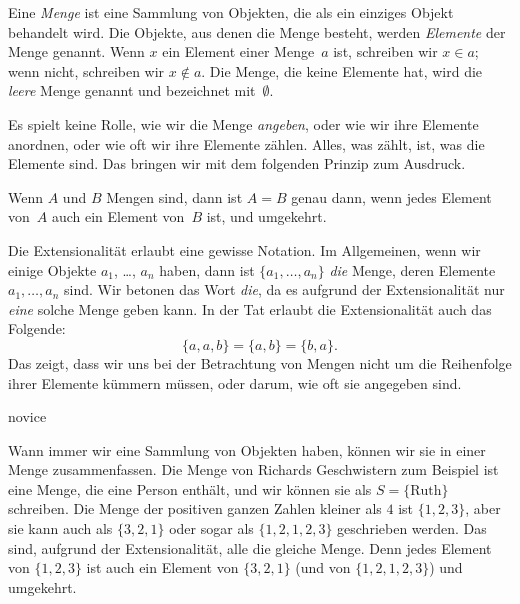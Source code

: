 \documentclass[../../../include/open-logic-section]{subfiles}
\begin{document}

Eine \emph{Menge} ist eine Sammlung von Objekten, die als ein einziges
Objekt behandelt wird. Die Objekte, aus denen die Menge besteht, werden \emph{Elemente} der Menge genannt. Wenn $x$ ein Element 
einer Menge~$a$ ist, schreiben wir $x \in a$; wenn nicht, schreiben wir $x \notin a$. Die Menge, die keine
Elemente hat, wird die \emph{leere} Menge genannt und
bezeichnet mit~\glqq$\emptyset$\grqq.

\begin{explain}
Es spielt keine Rolle, wie wir die Menge \emph{angeben}, oder wie wir
ihre Elemente anordnen, oder wie oft wir ihre Elemente zählen. Alles, was zählt, ist, was die Elemente
sind. Das bringen wir mit dem folgenden Prinzip zum Ausdruck.
\end{explain}

\begin{defn}[Extensionalität]
  Wenn $A$ und $B$ Mengen sind, dann ist $A = B$ genau dann, wenn
  jedes Element von~$A$ auch ein Element von~$B$ ist, und umgekehrt.
\end{defn}

Die Extensionalität erlaubt eine gewisse Notation. Im Allgemeinen, wenn wir einige
Objekte $a_{1}$, \dots, $a_{n}$ haben, dann ist $\{a_{1}, \dots, a_{n}\}$
\emph{die} Menge, deren Elemente $a_1, \dots, a_n$ sind. Wir betonen das Wort \glqq\emph{die}\grqq, da es aufgrund der Extensionalität
nur \emph{eine} solche Menge geben kann. In der Tat erlaubt die Extensionalität auch das
Folgende:
  \[
    \{a, a, b\} = \{a, b\} = \{b,a\}.
  \] 
Das zeigt, dass wir uns bei der Betrachtung von Mengen nicht um die Reihenfolge ihrer Elemente kümmern müssen, 
oder darum, wie oft sie angegeben sind.

\begin{tagblock}{novice}
\begin{ex}
Wann immer wir eine Sammlung von Objekten haben, können wir sie in einer Menge zusammenfassen.
 Die Menge von Richards Geschwistern zum Beispiel ist eine Menge, die
eine Person enthält, und wir können sie als $S=\{\textrm{Ruth}\}$ schreiben.
Die Menge der positiven ganzen Zahlen kleiner als $4$ ist $\{1, 2, 3\}$, aber sie
kann auch als $\{3, 2, 1\}$ oder sogar als $\{1, 2, 1, 2, 3\}$ geschrieben werden.
Das sind, aufgrund der Extensionalität, alle die gleiche Menge. Denn jedes Element
von $\{1, 2, 3\}$ ist auch ein Element von $\{3, 2, 1\}$ (und von $\{1,
2, 1, 2, 3\}$) und umgekehrt.
\end{ex} 
\end{tagblock}
\end{document}
